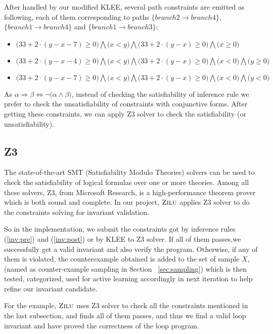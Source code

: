 After handled by our modified KLEE,
several path constraints are emitted as following, each of them corresponding to paths 
$\{branch2 \to branch4\}$, $\{branch1 \to branch4\}$ and $\{branch1 \to branch3\}$:


\begin{itemize}
\item $\big(33+2\cdot(y-x-7)\ge0\big) \bigwedge \big(x<y\big) \bigwedge \big(33+2\cdot(y-x)\ge0\big) \bigwedge \big(x\ge0\big)$
\item $\big(33+2\cdot(y-x-4)\ge0\big) \bigwedge \big(x<y\big) \bigwedge \big(33+2\cdot(y-x)\ge0\big) \bigwedge \big(x<0\big) \bigwedge \big(y\ge0\big)$
\item $\big(33+2\cdot(y-x-7)\ge0\big) \bigwedge \big(x<y\big) \bigwedge \big(33+2\cdot(y-x)\ge0\big) \bigwedge \big(x<0\big) \bigwedge \big(y<0\big)$
\end{itemize}
As $\alpha \Rightarrow \beta \Longleftrightarrow \neg \big(\alpha \wedge \beta\big)$, 
instead of checking the satisfiability of inference rule
we prefer to check the unsatisfiability of constraints with conjunctive forms. 
After getting these constraints, we can apply Z3\cite{de2008z3} solver to check the satisfiability (or unsatisfiability).

\subsection{Z3}
The state-of-the-art SMT (Satisfiability Modulo Theories)\cite{barrett2009satisfiability}  solvers can be used to 
check the satisfiability of logical formulas over one or more theories. 
Among all these solvers, Z3\cite{de2008z3}, from Microsoft Research, is a high-performance theorem prover which is both sound and complete.
In our project, $\textsc{Zilu}$ applies Z3 solver to do the constraints solving for invariant validation. 

So in the implementation, we submit the constraints got by inference rules (\ref{inv:pre}) and (\ref{inv:post}) or by KLEE to Z3 solver.
If all of them passes,we successfully get a valid invariant and also verify the program. 
Otherwise, if any of them is violated, the counterexample obtained is added to the set of sample $X$, 
(named as counter-example sampling in Section ~\ref{sec:sampling})
which is then tested, categorized, used for active learning accordingly in next iteration to help refine our invariant candidate.

For the example, $\textsc{Zilu}$ uses Z3 solver to check all the constraints mentioned in the last subsection,
and finds all of them passes, and thus we find a valid loop invariant and have proved the correctness of the loop program.

